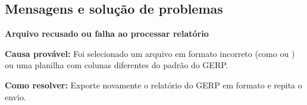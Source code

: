 \subsection*{Mensagens e solução de problemas}

\begin{remark}
\textbf{Arquivo recusado ou falha ao processar relatório}\par
\textbf{Causa provável:} Foi selecionado um arquivo em formato incorreto (como  ou ) ou uma planilha com colunas diferentes do padrão do GERP.\par
\textbf{Como resolver:} Exporte novamente o relatório  do GERP em formato  e repita o envio.
\end{remark}

\fimdecapitulo
